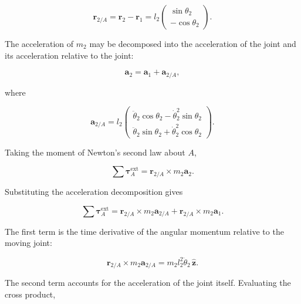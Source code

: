 \begin{equation}
    \mathbf{r}_{2/A}
    =
    \mathbf{r}_2-\mathbf{r}_1
    =
    l_2
    \begin{pmatrix}
        \sin\theta_2\\
        -\cos\theta_2
    \end{pmatrix}.
\end{equation}

The acceleration of \(m_2\) may be decomposed into the acceleration of the joint and its acceleration relative to the joint:

\begin{equation}
    \mathbf{a}_2
    =
    \mathbf{a}_1+\mathbf{a}_{2/A},
\end{equation}

where

\begin{equation}
    \mathbf{a}_{2/A}
    =
    l_2
    \begin{pmatrix}
        \ddot{\theta}_2\cos\theta_2
        -\dot{\theta}_2^2\sin\theta_2\\
        \ddot{\theta}_2\sin\theta_2
        +\dot{\theta}_2^2\cos\theta_2
    \end{pmatrix}.
\end{equation}

Taking the moment of Newton's second law about \(A\),

\begin{equation}
    \sum\boldsymbol{\tau}_A^{\mathrm{ext}}
    =
    \mathbf{r}_{2/A}\times m_2\mathbf{a}_2.
\end{equation}

Substituting the acceleration decomposition gives

\begin{equation}
    \sum\boldsymbol{\tau}_A^{\mathrm{ext}}
    =
    \mathbf{r}_{2/A}\times m_2\mathbf{a}_{2/A}
    +
    \mathbf{r}_{2/A}\times m_2\mathbf{a}_1.
\end{equation}

The first term is the time derivative of the angular momentum relative to the moving joint:

\begin{equation}
    \mathbf{r}_{2/A}\times m_2\mathbf{a}_{2/A}
    =
    m_2l_2^2\ddot{\theta}_2\,\hat{\mathbf{z}}.
\end{equation}

The second term accounts for the acceleration of the joint itself. Evaluating the cross product,

